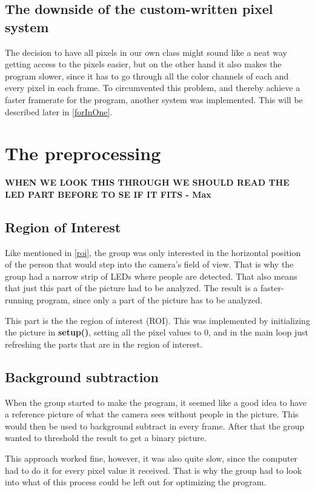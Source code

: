 \subsection{The downside of the custom-written pixel system}
The decision to have all pixels in our own class might sound like a neat way getting access to the pixels easier, but on the other hand it also makes the program slower, since it has to go through all the color channels of each and every pixel in each frame. To circumvented this problem, and thereby achieve a faster framerate for the program, another system was implemented. This will be described later in \ref{forInOne}. 

\section{The preprocessing}
\textbf{WHEN WE LOOK THIS THROUGH WE SHOULD READ THE LED PART BEFORE TO SE IF IT FITS - Max}

\subsection{Region of Interest}
Like mentioned in \ref{roi}, the group was only interested in the horizontal position of the person that would step into the camera's field of view. That is why the group had a narrow strip of LEDs where people are detected. That also means that just this part of the picture had to be analyzed. The result is a faster-running program, since only a part of the picture has to be analyzed.

This part is the the region of interest (ROI). This was implemented by initializing the picture in \textbf{setup()}, setting all the pixel values to 0, and in the main loop just refreshing the parts that are in the region of interest.
 
\subsection{Background subtraction}
When the group started to make the program, it seemed like a good idea to have a reference picture of what the camera sees without people in the picture. This would then be used to background subtract in every frame. After that the group wanted to threshold the result to get a binary picture. 

This approach worked fine, however, it was also quite slow, since the computer had to do it for every pixel value it received. That is why the group had to look into what of this process could be left out for optimizing the program.

